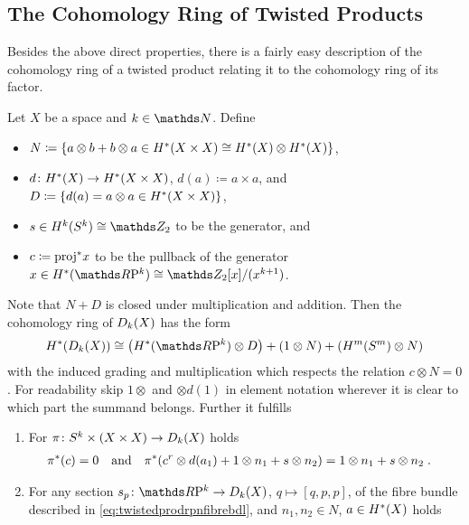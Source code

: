 \subsection{The Cohomology Ring of Twisted Products}
Besides the above direct properties, there is a fairly easy
description of the cohomology ring of a twisted product relating it to
the cohomology ring of its factor.
\begin{Thm}\label{thm:twistedprod:cohomstructure}
  Let $X$ be a space and $k\in\Nat$.
  Define
  \begin{itemize}
  \item
    $N\coloneqq
    \left\{
        a\otimes b + b\otimes a
        \in H^*(X\times X)\cong H^*(X)\otimes H^*(X)
      \right\}$,
  \item
    $d\colon H^*(X)\to H^*(X\times X)$,
    $d(a)\coloneqq a\times a$, and
    $D\coloneqq
    \left\{ d(a)=a\otimes a \in H^*(X\times X) \right\}$,
  \item
    $s\in\H^k(\Sphere k)\cong\Zmod2$ to be the generator, and
  \item
    $c\coloneqq {\mathrm{proj}}^* x$ to be the pullback of the generator
    $x\in\H^*(\RP k)\cong\Zmod2[x]/(x^{k+1})$.
  \end{itemize}
  Note that $N+D$ is closed under multiplication and addition.
  Then the cohomology ring of $D_{k}({X})$ has the form
  \begin{gather*}
    \H^*(\Twistedprod{k}{X})
    \cong
    \left(\H^*(\RP k)\otimes D\right)
    + \left( 1\otimes N \right)
    + \left( \H^m(\Sphere m) \otimes N \right)
  \end{gather*}
  with the induced grading and multiplication which respects the
  relation $c\otimes N=0$.
  For readability skip $1\otimes$ and $\otimes d(1)$ in element
  notation wherever it is clear to which part the summand belongs.
  Further it fulfills
  \begin{enumerate}
  \item
    For $\pi\colon S^{k}\times(X\times X)\to D_{k}({X})$
    holds
    \begin{align}\label{eq:twistedprodcohom:pi}
      {\pi}^*(c)&=0
      &\text{and}&
      &{\pi}^*(c^r\otimes d(a_1) + 1\otimes n_1 + s\otimes n_2)
      &= 1\otimes n_1 + s\otimes n_2
        \;.
    \end{align}
  \item
    For any section $s_p\colon\RP k\to\Twistedprod{k}{X}$, $q\mapsto[q,p,p]$,
    of the fibre bundle described in
    \eqref{eq:twistedprodrpnfibrebdl}, and $n_1,n_2\in N$, $a\in H^*(X)$ holds

\end{enumerate}
\end{Thm}
